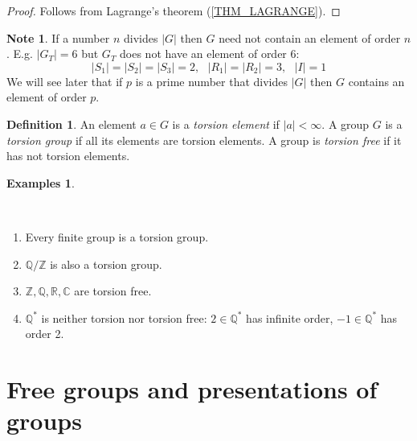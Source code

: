 \documentclass[12pt, letterpaper, oneside]{article}
\theoremstyle{plain}
\theoremstyle{definition}
\newtheorem{definition}[theorem]{Definition}
\newtheorem{examples}[theorem]{Examples}
\newtheorem{note}[theorem]{Note}
\newcommand{\Z}{{\mathbb Z}}
\newcommand{\Q}{{\mathbb Q}}
\newcommand{\R}{{\mathbb R}}
\newcommand{\C}{{\mathbb C}}
\newcommand{\benu}{\begin{enumerate}}
\newcommand{\eenu}{\end{enumerate}}
\newcommand{\vs}{\vskip 5mm}
\newcommand{\isep}[1][0]{\setlength{\itemsep}{#1 mm}}
\begin{document}
\vs

\begin{proof}
Follows from Lagrange's theorem (\ref{THM_LAGRANGE}).
\end{proof}

\vs

\begin{note}
If a number $n$ divides $|G|$ then $G$ need not contain an element of order $n$.
E.g. $|G_{T}| = 6$ but $G_{T}$ does not have an element of order $6$: 
$$|S_{1}|=|S_{2}| = |S_{3}| = 2, \ \ \ |R_{1}|= |R_{2}| = 3, \ \ \ |I|=1$$
We will see later that if $p$ is a prime number that divides $|G|$ then $G$ contains an element
of order $p$.
\end{note}

\vs 

\begin{definition}
An element $a\in G$ is a \emph{torsion element} if $|a|< \infty$. A group $G$ is a 
\emph{torsion group} if all its elements are torsion elements. A group is \emph{torsion free}
if it has not torsion elements.
\end{definition}


\vs 


\begin{examples}\ 

\vskip -13mm

\ 
\benu
\isep
\item Every finite group is a torsion group.
\item $\Q/\Z$ is also a torsion group.
\item $\Z, \Q, \R, \C$ are torsion free.
\item $\Q^{\ast}$ is neither torsion nor torsion free: $2\in \Q^{\ast}$ has infinite order, 
$-1\in \Q^{\ast}$ has order 2. 

\eenu 

\end{examples}




\newpage
\section{Free groups and presentations of groups}
\label{SEC_FREEGPS}
\end{document}
